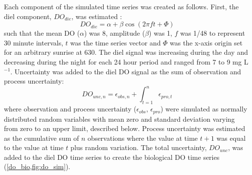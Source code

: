 \documentclass[letterpaper,12pt,oneside]{article}\usepackage[]{graphicx}\usepackage[]{color}
\begin{document}
Each component of the simulated time series was created as follows.  First, the diel component, $DO_{die}$, was estimated \citep{Cryer08}:
\begin{equation} \label{do_sin}
DO_{die} = \alpha + \beta\cos\left(2\pi ft + \Phi\right)
\end{equation}
such that the mean DO ($\alpha$) was 8, amplitude ($\beta$) was 1, $f$ was 1/48 to represent 30 minute intervals, $t$ was the time series vector and $\Phi$ was the x-axis origin set for an arbitrary sunrise at 630.  The diel signal was increasing during the day and decreasing during the night for each 24 hour period and ranged from 7 to 9 mg L$^{-1}$.  Uncertainty was added to the diel \ac{DO} signal as the sum of observation and process uncertainty:
\begin{equation} \label{do_unc_n}
DO_{unc, n} = \epsilon_{obs, n} + \int_{t = 1}^{n} \epsilon_{pro, t}
\end{equation}
where observation and process uncertainty ($\epsilon_{obs}$, $\epsilon_{pro}$) were simulated as normally distributed random variables with mean zero and standard deviation varying from zero to an upper limit, described below.  Process uncertainty was estimated as the cumulative sum of $n$ observations where the value at time $t+1$ was equal to the value at time $t$ plus random variation.  The total uncertainty, $DO_{unc}$, was added to the diel \ac{DO} time series to create the biological \ac{DO} time series (\cref{do_bio,fig:do_sim}).
\end{document}
